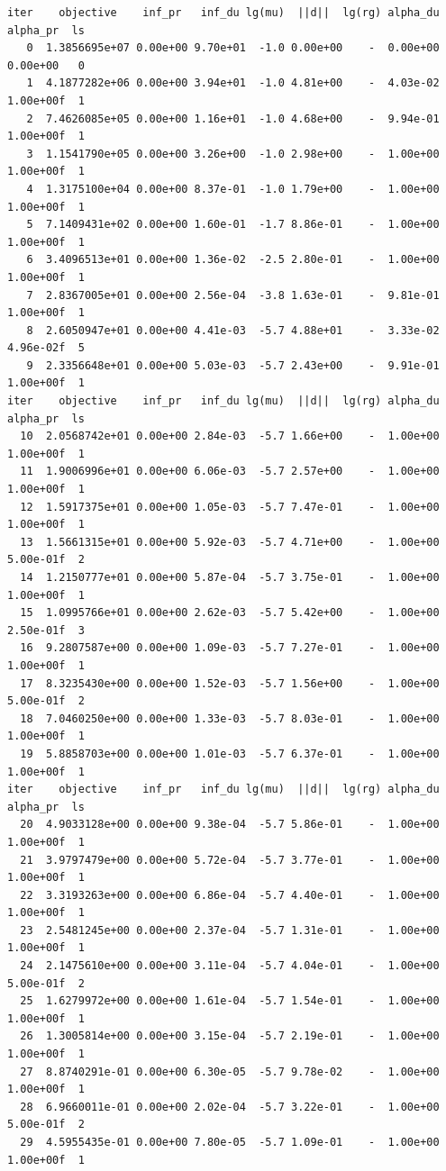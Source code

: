 \begin{verbatim}
iter    objective    inf_pr   inf_du lg(mu)  ||d||  lg(rg) alpha_du alpha_pr  ls
   0  1.3856695e+07 0.00e+00 9.70e+01  -1.0 0.00e+00    -  0.00e+00 0.00e+00   0
   1  4.1877282e+06 0.00e+00 3.94e+01  -1.0 4.81e+00    -  4.03e-02 1.00e+00f  1
   2  7.4626085e+05 0.00e+00 1.16e+01  -1.0 4.68e+00    -  9.94e-01 1.00e+00f  1
   3  1.1541790e+05 0.00e+00 3.26e+00  -1.0 2.98e+00    -  1.00e+00 1.00e+00f  1
   4  1.3175100e+04 0.00e+00 8.37e-01  -1.0 1.79e+00    -  1.00e+00 1.00e+00f  1
   5  7.1409431e+02 0.00e+00 1.60e-01  -1.7 8.86e-01    -  1.00e+00 1.00e+00f  1
   6  3.4096513e+01 0.00e+00 1.36e-02  -2.5 2.80e-01    -  1.00e+00 1.00e+00f  1
   7  2.8367005e+01 0.00e+00 2.56e-04  -3.8 1.63e-01    -  9.81e-01 1.00e+00f  1
   8  2.6050947e+01 0.00e+00 4.41e-03  -5.7 4.88e+01    -  3.33e-02 4.96e-02f  5
   9  2.3356648e+01 0.00e+00 5.03e-03  -5.7 2.43e+00    -  9.91e-01 1.00e+00f  1
iter    objective    inf_pr   inf_du lg(mu)  ||d||  lg(rg) alpha_du alpha_pr  ls
  10  2.0568742e+01 0.00e+00 2.84e-03  -5.7 1.66e+00    -  1.00e+00 1.00e+00f  1
  11  1.9006996e+01 0.00e+00 6.06e-03  -5.7 2.57e+00    -  1.00e+00 1.00e+00f  1
  12  1.5917375e+01 0.00e+00 1.05e-03  -5.7 7.47e-01    -  1.00e+00 1.00e+00f  1
  13  1.5661315e+01 0.00e+00 5.92e-03  -5.7 4.71e+00    -  1.00e+00 5.00e-01f  2
  14  1.2150777e+01 0.00e+00 5.87e-04  -5.7 3.75e-01    -  1.00e+00 1.00e+00f  1
  15  1.0995766e+01 0.00e+00 2.62e-03  -5.7 5.42e+00    -  1.00e+00 2.50e-01f  3
  16  9.2807587e+00 0.00e+00 1.09e-03  -5.7 7.27e-01    -  1.00e+00 1.00e+00f  1
  17  8.3235430e+00 0.00e+00 1.52e-03  -5.7 1.56e+00    -  1.00e+00 5.00e-01f  2
  18  7.0460250e+00 0.00e+00 1.33e-03  -5.7 8.03e-01    -  1.00e+00 1.00e+00f  1
  19  5.8858703e+00 0.00e+00 1.01e-03  -5.7 6.37e-01    -  1.00e+00 1.00e+00f  1
iter    objective    inf_pr   inf_du lg(mu)  ||d||  lg(rg) alpha_du alpha_pr  ls
  20  4.9033128e+00 0.00e+00 9.38e-04  -5.7 5.86e-01    -  1.00e+00 1.00e+00f  1
  21  3.9797479e+00 0.00e+00 5.72e-04  -5.7 3.77e-01    -  1.00e+00 1.00e+00f  1
  22  3.3193263e+00 0.00e+00 6.86e-04  -5.7 4.40e-01    -  1.00e+00 1.00e+00f  1
  23  2.5481245e+00 0.00e+00 2.37e-04  -5.7 1.31e-01    -  1.00e+00 1.00e+00f  1
  24  2.1475610e+00 0.00e+00 3.11e-04  -5.7 4.04e-01    -  1.00e+00 5.00e-01f  2
  25  1.6279972e+00 0.00e+00 1.61e-04  -5.7 1.54e-01    -  1.00e+00 1.00e+00f  1
  26  1.3005814e+00 0.00e+00 3.15e-04  -5.7 2.19e-01    -  1.00e+00 1.00e+00f  1
  27  8.8740291e-01 0.00e+00 6.30e-05  -5.7 9.78e-02    -  1.00e+00 1.00e+00f  1
  28  6.9660011e-01 0.00e+00 2.02e-04  -5.7 3.22e-01    -  1.00e+00 5.00e-01f  2
  29  4.5955435e-01 0.00e+00 7.80e-05  -5.7 1.09e-01    -  1.00e+00 1.00e+00f  1

\end{verbatim}
